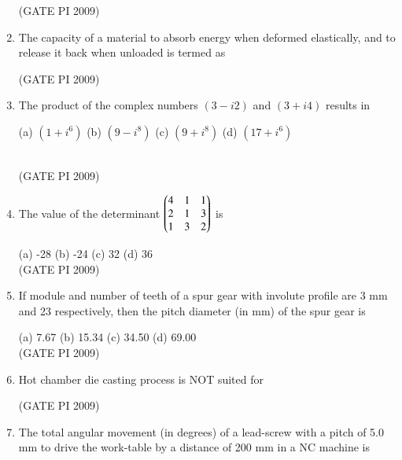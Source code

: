 \documentclass[journal,12pt,onecolumn]{IEEEtran}
\theoremstyle{remark}
\begin{document}
\begin{enumerate}[label=Q.\arabic*]
\begin{enumerate}
\end{enumerate}
\hfill (GATE PI 2009)
\item The capacity of a material to absorb energy when deformed elastically, and to release it back when unloaded is termed as
\begin{enumerate}
\end{enumerate}
\hfill (GATE PI 2009)
\item The product of the complex numbers $(3 - i2)$ and $(3 + i4)$ results in

(a) $(1 + i^6)$ \hfill (b) $(9-i^8)$ \hfill (c) $(9+i^8)$ \hfill (d) $(17 + i^6)$ \\\

\hfill (GATE PI 2009)
\item The value of the determinant
$
\begin{pmatrix}
4 & 1 & 1 \\
2 & 1 & 3 \\
1 & 3 & 2
\end{pmatrix}
$
is

(a) -28 \hfill (b) -24 \hfill(c) 32 \hfill (d) 36 \\

\hfill (GATE PI 2009)

\item If module and number of teeth of a spur gear with involute profile are 3 mm and 23 respectively, then the pitch diameter (in mm) of the spur gear is

(a) 7.67 \hfill (b) 15.34 \hfill (c) 34.50 \hfill (d) 69.00  \\

\hfill (GATE PI 2009)
\item Hot chamber die casting process is NOT suited for
\begin{enumerate}
\end{enumerate}
\hfill (GATE PI 2009)
\item The total angular movement (in degrees) of a lead-screw with a pitch of 5.0 mm to drive the work-table by a distance of 200 mm in a NC machine is \\


\end{enumerate}
\end{document}

